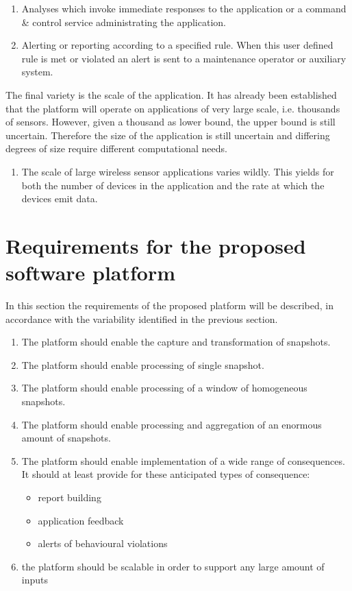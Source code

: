 \begin{enumerate}[label=V\archid .\arabic*]
\begin{enumerate}
\item Analyses which invoke immediate responses to the application or a command \& control service administrating the application.
\item Alerting or reporting according to a specified rule. When this user defined rule is met or violated an alert is sent to a maintenance operator or auxiliary system.
\end{enumerate}
\end{enumerate}
The final variety is the scale of the application. It has already been established that the platform will operate on applications of very large scale, i.e. thousands of sensors. However, given a thousand as lower bound, the upper bound is still uncertain. Therefore the size of the application is still uncertain and differing degrees of size require different computational needs.
\begin{enumerate}[label=V\archid .\arabic* , resume]
\nospace
\item \label{v:scale} The scale of large wireless sensor applications varies wildly. This yields for both the number of devices in the application and the rate at which the devices emit data.
\end{enumerate}
\section{Requirements for the proposed software platform}
In this section the requirements of the proposed platform will be described, in accordance with the variability identified in the previous section. 
\begin{enumerate}[label=R\archid .\arabic*]
\nospace
\item \label{r:snaptshot_transformation} The platform should enable the capture and transformation of snapshots.
\item \label{r:basis_single} The platform should enable processing of single snapshot.
\item \label{r:basis_historic} The platform should enable processing of a window of homogeneous snapshots.
\item \label{r:basis_accumulated} The platform should enable processing and aggregation of an enormous amount of snapshots.
\item \label{r:consequence} The platform should enable implementation of a wide range of consequences. It should at least provide for these anticipated types of consequence:
\begin{itemize}
\nospace
\item report building
\item application feedback
\item alerts of behavioural violations
\end{itemize}
\item \label{r:scale} the platform should be scalable in order to support any large amount of inputs
\end{enumerate}

